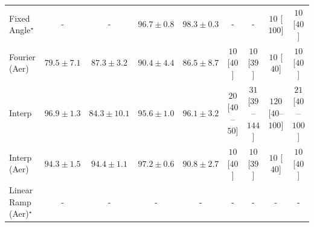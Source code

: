 \begin{tabular}{l|cccc|cccc|}
Fixed Angle$^\star$ & {\cellcolor[HTML]{000000}} \color[HTML]{F1F1F1} {\cellcolor{white}} \color{black} - & {\cellcolor[HTML]{000000}} \color[HTML]{F1F1F1} {\cellcolor{white}} \color{black} - & {\cellcolor[HTML]{862E05}} \color[HTML]{F1F1F1} $96.7\pm 0.8$ & {\cellcolor[HTML]{682506}} \color[HTML]{F1F1F1} $98.3\pm 0.3$ & {\cellcolor[HTML]{000000}} \color[HTML]{F1F1F1} {\cellcolor{white}} \color{black} - & {\cellcolor[HTML]{000000}} \color[HTML]{F1F1F1} {\cellcolor{white}} \color{black} - & {\cellcolor[HTML]{FFF7F3}} \color[HTML]{000000} $10$ [$100$] & {\cellcolor[HTML]{FFF7F3}} \color[HTML]{000000} $10$ [$40$] \\
Fourier (Aer) & {\cellcolor[HTML]{FFF7BC}} \color[HTML]{000000} $79.5\pm 7.1$ & {\cellcolor[HTML]{FE9E2D}} \color[HTML]{000000} $87.3\pm 3.2$ & {\cellcolor[HTML]{EA6E13}} \color[HTML]{F1F1F1} $90.4\pm 4.4$ & {\cellcolor[HTML]{FEAB39}} \color[HTML]{000000} $86.5\pm 8.7$ & {\cellcolor[HTML]{FFF7F3}} \color[HTML]{000000} $10$ [$40$] & {\cellcolor[HTML]{FFF7F3}} \color[HTML]{000000} $10$ [$39$] & {\cellcolor[HTML]{FFF7F3}} \color[HTML]{000000} $10$ [$40$] & {\cellcolor[HTML]{FFF7F3}} \color[HTML]{000000} $10$ [$40$] \\
Interp & {\cellcolor[HTML]{812D05}} \color[HTML]{F1F1F1} $96.9\pm 1.3$ & {\cellcolor[HTML]{FECB5F}} \color[HTML]{000000} $84.3\pm 10.1$ & {\cellcolor[HTML]{9B3504}} \color[HTML]{F1F1F1} $95.6\pm 1.0$ & {\cellcolor[HTML]{913204}} \color[HTML]{F1F1F1} $96.1\pm 3.2$ & {\cellcolor[HTML]{FFF5F1}} \color[HTML]{000000} $20$ [$40$--$50$] & {\cellcolor[HTML]{FEF1ED}} \color[HTML]{000000} $31$ [$39$--$144$] & {\cellcolor[HTML]{FDD8D5}} \color[HTML]{000000} $120$ [$40$--$100$] & {\cellcolor[HTML]{FFF4F0}} \color[HTML]{000000} $21$ [$40$--$100$] \\
Interp (Aer) & {\cellcolor[HTML]{B34003}} \color[HTML]{F1F1F1} $94.3\pm 1.5$ & {\cellcolor[HTML]{B13F03}} \color[HTML]{F1F1F1} $94.4\pm 1.1$ & {\cellcolor[HTML]{7C2C05}} \color[HTML]{F1F1F1} $97.2\pm 0.6$ & {\cellcolor[HTML]{E66A11}} \color[HTML]{F1F1F1} $90.8\pm 2.7$ & {\cellcolor[HTML]{FFF7F3}} \color[HTML]{000000} $10$ [$40$] & {\cellcolor[HTML]{FFF7F3}} \color[HTML]{000000} $10$ [$39$] & {\cellcolor[HTML]{FFF7F3}} \color[HTML]{000000} $10$ [$40$] & {\cellcolor[HTML]{FFF7F3}} \color[HTML]{000000} $10$ [$40$] \\
Linear Ramp (Aer)$^\star$ & {\cellcolor[HTML]{000000}} \color[HTML]{F1F1F1} {\cellcolor{white}} \color{black} - & {\cellcolor[HTML]{000000}} \color[HTML]{F1F1F1} {\cellcolor{white}} \color{black} - & {\cellcolor[HTML]{000000}} \color[HTML]{F1F1F1} {\cellcolor{white}} \color{black} - & {\cellcolor[HTML]{000000}} \color[HTML]{F1F1F1} {\cellcolor{white}} \color{black} - & {\cellcolor[HTML]{000000}} \color[HTML]{F1F1F1} {\cellcolor{white}} \color{black} - & {\cellcolor[HTML]{000000}} \color[HTML]{F1F1F1} {\cellcolor{white}} \color{black} - & {\cellcolor[HTML]{000000}} \color[HTML]{F1F1F1} {\cellcolor{white}} \color{black} - & {\cellcolor[HTML]{000000}} \color[HTML]{F1F1F1} {\cellcolor{white}} \color{black} - \\

\end{tabular}
